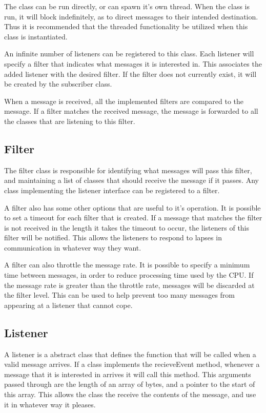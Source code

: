 The class can be run directly, or can spawn it's own thread. When the class is run, it will block indefinitely, as to direct messages to their intended destination. Thus it is recommended that the threaded functionality be utilized when this class is instantiated. 

An infinite number of listeners can be registered to this class. Each listener will specify a filter that indicates what messages it is interested in. This associates the added listener with the desired filter. If the filter does not currently exist, it will be created by the subscriber class.

When a message is received, all the implemented filters are compared to the message. If a filter matches the received message, the message is forwarded to all the classes that are listening to this filter.

\subsection{Filter}

The filter class is responsible for identifying what messages will pass this filter, and maintaining a list of classes that should receive the message if it passes. Any class implementing the listener interface can be registered to a filter.

A filter also has some other options that are useful to it's operation. It is possible to set a timeout for each filter that is created. If a message that matches the filter is not received in the length it takes the timeout to occur, the listeners of this filter will be notified. This allows the listeners to respond to lapses in communication in whatever way they want. 

A filter can also throttle the message rate. It is possible to specify a minimum time between messages, in order to reduce processing time used by the CPU. If the message rate is greater than the throttle rate, messages will be discarded at the filter level. This can be used to help prevent too many messages from appearing at a listener that cannot cope.

\subsection{Listener}

A listener is a abstract class that defines the function that will be called when a valid message arrives. If a class implements the recieveEvent method, whenever a message that it is interested in arrives it will call this method. This arguments passed through are the length of an array of bytes, and a pointer to the start of this array. This allows the class the receive the contents of the message, and use it in whatever way it pleases.

